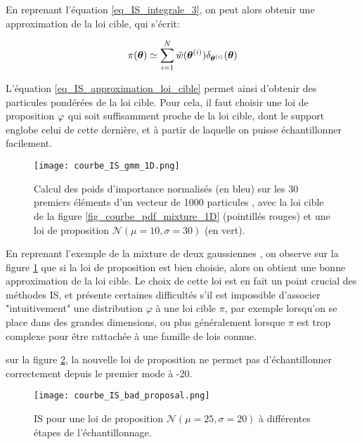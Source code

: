 En reprenant l'équation \eqref{eq_IS_integrale_3}, on peut alors obtenir une approximation de la loi cible, qui s'écrit:
 
 \begin{equation}
 \pi({\bm{\theta}}) \simeq \sum\limits_{i=1}^N {\tilde{w}}({\bm{\theta}}^{(i)})\delta_{{\bm{\theta}}^{(i)}}({\bm{\theta}})
 \label{eq_IS_approximation_loi_cible}
 \end{equation}

L'équation \eqref{eq_IS_approximation_loi_cible} permet ainsi d'obtenir des particules pondérées de la loi cible. Pour cela, il faut choisir une loi de proposition ${\varphi}$ qui soit suffisamment proche de la loi cible, dont le support englobe celui de cette dernière, et à partir de laquelle on puisse échantillonner facilement. \\

\begin{figure}[h!]
	\centering
	\texttt{[image: courbe\_IS\_gmm\_1D.png]}
	\caption{Calcul des poids d'importance normalisés  (en bleu) sur les 30 premiers éléments d'un vecteur de 1000 particules , avec la loi cible de la figure \ref{fig_courbe_pdf_mixture_1D} (pointillés rouges) et une loi de proposition $\mathcal{N}(\mu = 10, \sigma = 30)$ (en vert).  }
	\label{fig_IS_gmm_1D}
\end{figure}

En reprenant l'exemple de la mixture de deux gaussiennes , on observe sur la figure \ref{fig_IS_gmm_1D} que si la loi de proposition est bien choisie, alors on obtient une bonne approximation de la loi cible. Le choix de cette loi est en fait un point crucial des méthodes IS, et présente certaines difficultés s'il est impossible d'associer "intuitivement" une distribution $\varphi$ à une loi cible $\pi$, par exemple lorsqu'on se place dans des grandes dimensions, ou plus généralement lorsque $\pi$ est trop complexe pour être rattachée à une famille de lois connue. 

sur la figure \ref{courbe_IS_bad_proposal}, la nouvelle loi de proposition ne permet pas d'échantillonner correctement depuis le premier mode à -20.

\begin{figure}[h!]
	\centering
	\texttt{[image: courbe\_IS\_bad\_proposal.png]}
	\caption{IS pour une loi de proposition $\mathcal{N}(\mu=25, \sigma=20)$ à différentes étapes de l'échantillonnage.}
	\label{courbe_IS_bad_proposal}
\end{figure}

